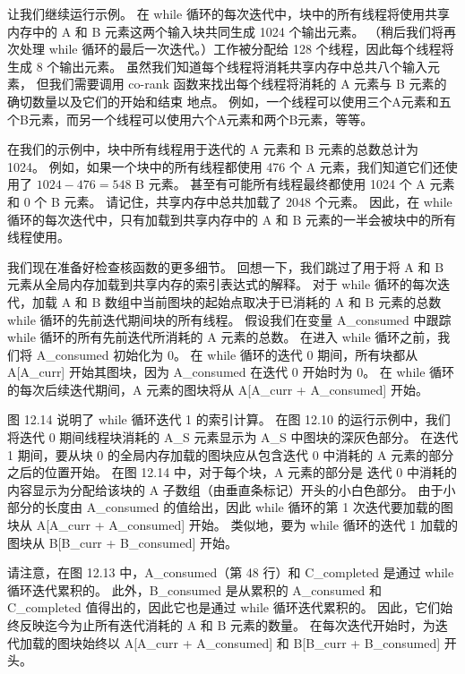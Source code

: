 让我们继续运行示例。 
在 while 循环的每次迭代中，块中的所有线程将使用共享内存中的 A 和 B 元素这两个输入块共同生成 1024 个输出元素。 
（稍后我们将再次处理 while 循环的最后一次迭代。）工作被分配给 128 个线程，因此每个线程将生成 8 个输出元素。 
虽然我们知道每个线程将消耗共享内存中总共八个输入元素，
但我们需要调用 co-rank 函数来找出每个线程将消耗的 A 元素与 B 元素的确切数量以及它们的开始和结束 地点。 
例如，一个线程可以使用三个A元素和五个B元素，而另一个线程可以使用六个A元素和两个B元素，等等。

在我们的示例中，块中所有线程用于迭代的 A 元素和 B 元素的总数总计为 1024。 
例如，如果一个块中的所有线程都使用 476 个 A 元素，我们知道它们还使用了 $1024-476=548$ B 元素。 
甚至有可能所有线程最终都使用 1024 个 A 元素和 0 个 B 元素。 请记住，共享内存中总共加载了 2048 个元素。 
因此，在 while 循环的每次迭代中，只有加载到共享内存中的 A 和 B 元素的一半会被块中的所有线程使用。

我们现在准备好检查核函数的更多细节。 
回想一下，我们跳过了用于将 $\mathrm{A}$ 和 $\mathrm{B}$ 元素从全局内存加载到共享内存的索引表达式的解释。 
对于 while 循环的每次迭代，加载 A 和 B 数组中当前图块的起始点取决于已消耗的 $\mathrm{A}$ 和 $\mathrm{B}$ 元素的总数 while 循环的先前迭代期间块的所有线程。 
假设我们在变量 A\_consumed 中跟踪 while 循环的所有先前迭代所消耗的 A 元素的总数。 
在进入 while 循环之前，我们将 A\_consumed 初始化为 0。 
在 while 循环的迭代 0 期间，所有块都从 A[A\_curr] 开始其图块，因为 A\_consumed 在迭代 0 开始时为 0。 
在 while 循环的每次后续迭代期间，A 元素的图块将从 A[A\_curr + A\_consumed] 开始。

图 12.14 说明了 while 循环迭代 1 的索引计算。 
在图 12.10 的运行示例中，我们将迭代 0 期间线程块消耗的 A\_S 元素显示为 A\_S 中图块的深灰色部分。 
在迭代 1 期间，要从块 0 的全局内存加载的图块应从包含迭代 0 中消耗的 A 元素的部分之后的位置开始。
在图 12.14 中，对于每个块，A 元素的部分是 迭代 0 中消耗的内容显示为分配给该块的 A 子数组（由垂直条标记）开头的小白色部分。 
由于小部分的长度由 A\_consumed 的值给出，因此 while 循环的第 1 次迭代要加载的图块从 A[A\_curr + A\_consumed] 开始。 
类似地，要为 while 循环的迭代 1 加载的图块从 B[B\_curr + B\_consumed] 开始。

请注意，在图 12.13 中，A\_consumed（第 48 行）和 C\_completed 是通过 while 循环迭代累积的。 
此外，B\_consumed 是从累积的 A\_consumed 和 C\_completed 值得出的，因此它也是通过 while 循环迭代累积的。 
因此，它们始终反映迄今为止所有迭代消耗的 $\mathrm{A}$ 和 $\mathrm{B}$ 元素的数量。 
在每次迭代开始时，为迭代加载的图块始终以 A[A\_curr + A\_consumed] 和 B[B\_curr + B\_consumed] 开头。

